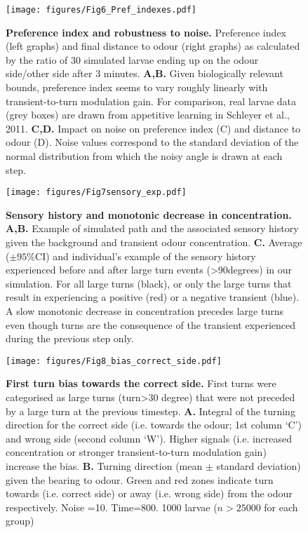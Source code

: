 \documentclass[10pt,a4paper]{article}
\begin{document}
\begin{figure}[!ht]
\begin{center}
\texttt{[image: figures/Fig6\_Pref\_indexes.pdf]}
\caption{{\bf Preference index and robustness to noise. }
Preference index (left graphs) and final distance to odour (right graphs) as calculated by the ratio of 30 simulated larvae ending up on the odour side/other side after 3 minutes.
{\bf A,B.} Given biologically relevant bounds, preference index seems to vary roughly linearly with transient-to-turn modulation gain. For comparison, real larvae data (grey boxes) are drawn from appetitive learning in Schleyer et al., 2011.
{\bf C,D.} Impact on noise on preference index (C) and distance to odour (D). Noise values correspond to the standard deviation of the normal distribution from which the noisy angle is drawn at each step.
\label{fig:Fig6}}
\end{center}
\end{figure}

\begin{figure}[!ht]
\begin{center}
\texttt{[image: figures/Fig7sensory\_exp.pdf]}
\caption{{\bf Sensory history and monotonic decrease in concentration.} {\bf A,B.} Example of simulated path and the associated sensory history given the background and transient odour concentration.
{\bf  C.} Average ($\pm 95\%$CI) and individual’s example of the sensory history experienced before and after large turn events (>90degrees) in our simulation. For all large turns (black), or only the large turns that result in experiencing a positive (red) or a negative transient (blue). A slow monotonic decrease in concentration precedes large turns even though turns are the consequence of the transient experienced during the previous step only.
\label{fig:Fig7}}
\end{center}
\end{figure}


\begin{figure}[!ht]
\begin{center}
\texttt{[image: figures/Fig8\_bias\_correct\_side.pdf]}
\caption{{\bf First turn bias towards the correct side.} First turns were categorised as large turns (turn>30 degree) that were not preceded by a large turn at the previous timestep.
{\bf A.} Integral of the turning direction for the correct side (i.e. towards the odour; 1st column ‘C’) and wrong side (second column ‘W’). Higher signals (i.e. increased concentration or stronger transient-to-turn modulation gain) increase the bias.
{\bf B.} Turning direction (mean $\pm$ standard deviation) given the bearing to odour. Green and red zones indicate turn towards (i.e. correct side) or away (i.e. wrong side) from the odour respectively. Noise =10. Time=800. 1000 larvae ($n > 25000$ for each group)
\label{fig:Fig8}}
\end{center}
\end{figure}
\end{document}
